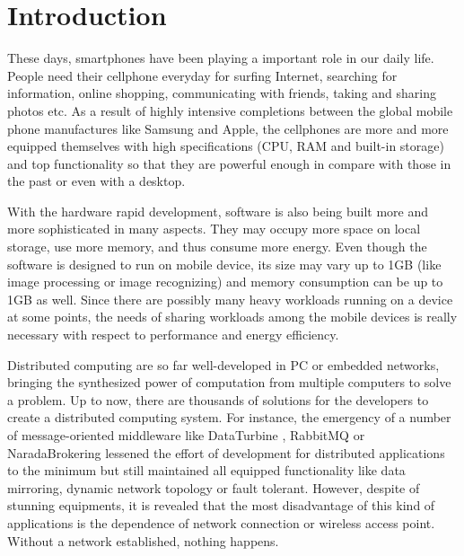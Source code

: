 \documentclass[conference]{IEEEtran}
\begin{document}
%
\IEEEpeerreviewmaketitle



\section{Introduction}
These days, smartphones have been playing a important role in our daily life. People need their cellphone everyday for surfing Internet, searching for information, online shopping, communicating with friends, taking and sharing photos etc. As a result of highly intensive completions between the global mobile phone manufactures like Samsung and Apple, the cellphones are more and more equipped themselves with high specifications (CPU, RAM and built-in storage) and top functionality so that they are powerful enough in compare with those in the past or even with a desktop. 

With the hardware rapid development, software is also being built more and more sophisticated in many aspects. They may occupy more space on local storage, use more memory, and thus consume more energy. Even though the software is designed to run on mobile device, its size may vary up to 1GB (like image processing or image recognizing) and memory consumption can be up to 1GB as well. Since there are possibly many heavy workloads running on a device at some points, the needs of sharing workloads among the mobile devices is really necessary with respect to performance and energy efficiency. 

Distributed computing are so far well-developed in PC or embedded networks, bringing the synthesized power of computation from multiple computers to solve a problem. Up to now, there are thousands of solutions for the developers to create a distributed computing system. For instance, the emergency of a number of message-oriented middleware like DataTurbine \cite{rbnb}, RabbitMQ \cite{rabbitmq} or NaradaBrokering \cite{naradabrokering} lessened the effort of development for distributed applications to the minimum but still maintained all equipped functionality like data mirroring, dynamic network topology or fault tolerant. However, despite of stunning equipments, it is revealed that the most disadvantage of this kind of applications is the dependence of network connection or wireless access point. Without a network established, nothing happens.
\end{document}
